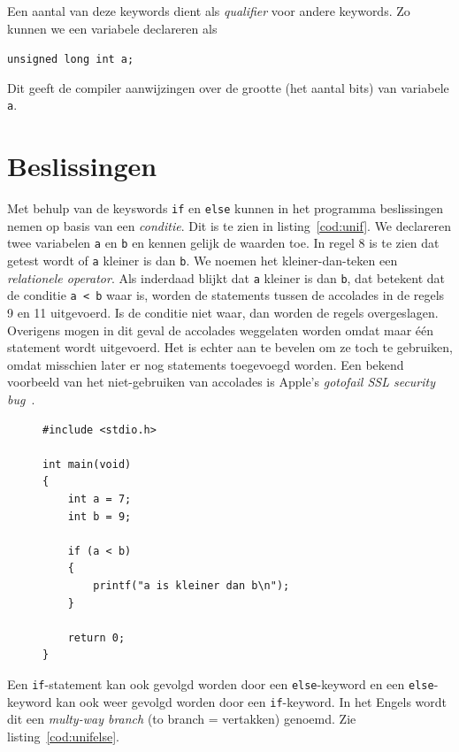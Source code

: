 Een aantal van deze keywords dient als \textsl{qualifier} voor andere keywords. Zo kunnen we een variabele declareren als

\hspace*{1em}\texttt{unsigned long int a;}

Dit geeft de compiler aanwijzingen over de grootte (het aantal bits) van variabele \texttt{a}.


\section{Beslissingen}
Met behulp van de keyswords \texttt{if} en \texttt{else} kunnen in het programma beslissingen nemen op basis van een \textsl{conditie}. Dit is te zien in listing~\ref{cod:unif}. We declareren twee variabelen \texttt{a} en \texttt{b} en kennen gelijk de waarden toe. In regel 8 is te zien dat getest wordt of \texttt{a} kleiner is dan \texttt{b}. We noemen het kleiner-dan-teken een \textsl{relationele operator}. Als inderdaad blijkt dat \texttt{a} kleiner is dan \texttt{b}, dat betekent dat de conditie \texttt{a < b} waar is, worden de statements tussen de accolades in de regels 9 en 11 uitgevoerd. Is de conditie niet waar, dan worden de regels overgeslagen. Overigens mogen in dit geval de accolades weggelaten worden omdat maar één statement wordt uitgevoerd. Het is echter aan te bevelen om ze toch te gebruiken, omdat misschien later er nog statements toegevoegd worden. Een bekend voorbeeld van het niet-gebruiken van accolades is Apple's \textsl{gotofail SSL security bug}~\cite{barr2014}.

\begin{figure}[!ht]
\begin{lstlisting}[caption=Afdrukken van tekst op basis van een beslissing.,label=cod:unif]
#include <stdio.h>

int main(void)
{
    int a = 7;
    int b = 9;
    
    if (a < b)
    {
        printf("a is kleiner dan b\n");
    }
    
    return 0;
}
\end{lstlisting}
\end{figure}

Een \texttt{if}-statement kan ook gevolgd worden door een \texttt{else}-keyword en een \texttt{else}-keyword kan ook weer gevolgd worden door een \texttt{if}-keyword. In het Engels wordt dit een \textsl{multy-way branch} (to branch = vertakken) genoemd. Zie listing~\ref{cod:unifelse}.

